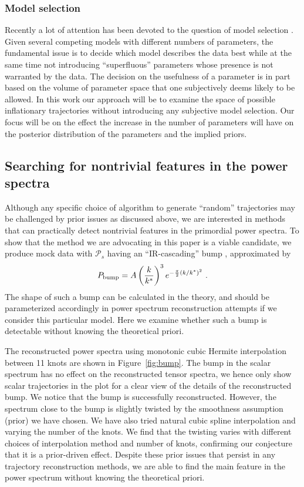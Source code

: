 \documentclass[a4paper,11pt]{article}
\newcommand{\pscalar}{{\mathcal{P}_s}}
\begin{document}
\subsubsection{Model selection}
Recently a lot of attention has been devoted to the question of model
selection \cite{Mukherjee:2005wg,Liddle:2006tc}. Given several
competing models with different numbers of parameters, the fundamental
issue is to decide which model describes the data best while at the
same time not introducing ``superfluous'' parameters whose presence is
not warranted by the data. The decision on the usefulness of a
parameter is in part based on the volume of parameter space that one
subjectively deems likely to be allowed. In this work our approach
will be to examine the space of possible inflationary trajectories
without introducing any subjective model selection. Our focus will be
on the effect the increase in the number of parameters will have on
the posterior distribution of the parameters and the implied priors.

\subsection{Searching for nontrivial features in the power spectra}

Although any specific choice of algorithm to generate ``random''
trajectories may be challenged by prior issues as discussed above, we
are interested in methods that can practically detect nontrivial
features in the primordial power spectra. To show that the method we
are advocating in this paper is a viable candidate, we produce mock
data with $\pscalar$ having an ``IR-cascading''
bump \cite{Barnaby2009a, Barnaby2009b}, approximated by
\begin{equation}
P_{\rm bump} = A\left(\frac{k}{k^*}\right)^3e^{-\frac{\pi}{2}\left(k/k^*\right)^2} \ .
\end{equation}
The shape of such a bump can be calculated in the theory, and should be parameterized accordingly in power spectrum reconstruction attempts if we consider
this particular model. Here we examine  whether such a bump is
detectable without knowing the theoretical priori. 

The reconstructed power spectra using monotonic cubic Hermite
interpolation between 11 knots are shown in Figure~\ref{fig:bump}. 
The bump in the scalar spectrum has no effect on the reconstructed tensor spectra, we hence only show scalar trajectories in the plot for a clear view of the details of the reconstructed bump. We notice that the bump is successfully reconstructed. However, the spectrum close to the bump is slightly twisted by the smoothness
assumption (prior) we have chosen. We have also tried natural cubic spline interpolation and varying the number of the knots. We find that the twisting varies with different choices of interpolation method and number of knots, confirming our conjecture that it is a prior-driven effect. 
Despite these prior issues that persist in any trajectory
reconstruction methods, we are able to find the main feature in the power spectrum without knowing the theoretical priori.
\end{document}
